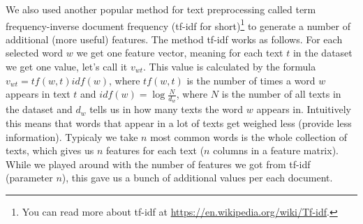We also used another popular method for text preprocessing called term
frequency-inverse document frequency (tf-idf for short)\footnote{You can read
more about tf-idf at \url{https://en.wikipedia.org/wiki/Tf-idf}.} to generate a
number of additional (more useful) features. The method tf-idf works as
follows. For each selected word $w$  we get one feature vector, meaning for
each text $t$ in the dataset we get one value, let's call it $v_{wt}$.  This
value is calculated by the formula $v_{wt} = tf(w, t)idf(w)$, where $tf(w, t)$
is the number of times a word $w$ appears in text $t$ and $idf(w) =
\log\frac{N}{d_{w}}$, where $N$ is the number of all texts in the dataset and
$d_{w}$ tells us in how many texts the word $w$ appears in. Intuitively this
means that words that appear in a lot of texts get weighed less (provide less
information). Typicaly we take $n$ most common words is the whole collection of
texts, which gives us $n$ features for each text ($n$ columns in a feature
matrix). While we played around with the number of features we got from tf-idf
(parameter $n$), this gave us a bunch of additional values per each document.
